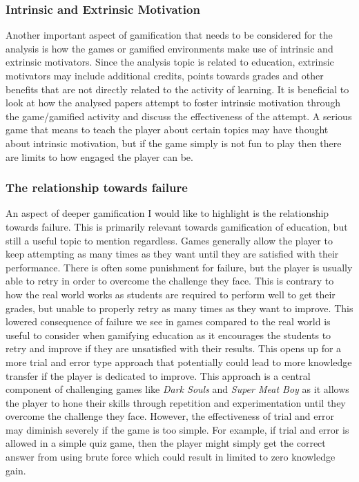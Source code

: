 \subsubsection{Intrinsic and Extrinsic Motivation}
Another important aspect of gamification that needs to be considered for the analysis is how the games or gamified environments make use of intrinsic and extrinsic motivators. Since the analysis topic is related to education, extrinsic motivators may include additional credits, points towards grades and other benefits that are not directly related to the activity of learning. It is beneficial to look at how the analysed papers attempt to foster intrinsic motivation through the game/gamified activity and discuss the effectiveness of the attempt. A serious game that means to teach the player about certain topics may have thought about intrinsic motivation, but if the game simply is not fun to play then there are limits to how engaged the player can be. 


\subsubsection{The relationship towards failure}\label{sec:failure}
An aspect of deeper gamification I would like to highlight is the relationship towards failure. This is primarily relevant towards gamification of education, but still a useful topic to mention regardless. Games generally allow the player to keep attempting as many times as they want until they are satisfied with their performance. There is often some punishment for failure, but the player is usually able to retry in order to overcome the challenge they face. This is contrary to how the real world works as students are required to perform well to get their grades, but unable to properly retry as many times as they want to improve. This lowered consequence of failure we see in games compared to the real world is useful to consider when gamifying education as it encourages the students to retry and improve if they are unsatisfied with their results. 
This opens up for a more trial and error type approach that potentially could lead to more knowledge transfer if the player is dedicated to improve. This approach is a central component of challenging games like \emph{Dark Souls} and \emph{Super Meat Boy} as it allows the player to hone their skills through repetition and experimentation until they overcome the challenge they face. However, the effectiveness of trial and error may diminish severely if the game is too simple. For example, if trial and error is allowed in a simple quiz game, then the player might simply get the correct answer from using brute force which could result in limited to zero knowledge gain.


